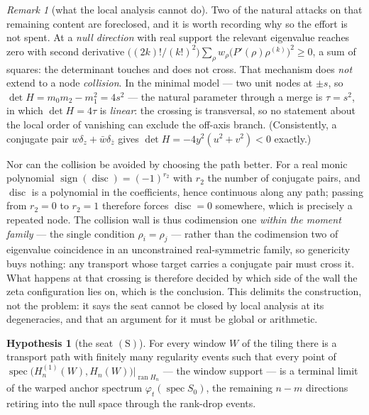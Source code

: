 \documentclass[11pt]{article}
\theoremstyle{plain}
\theoremstyle{definition}
\newtheorem{hypothesis}[theorem]{Hypothesis}
\theoremstyle{remark}
\newtheorem{remark}[theorem]{Remark}
\DeclareMathOperator{\spec}{spec}
\DeclareMathOperator{\ran}{ran}
\begin{document}
\begin{remark}[what the local analysis cannot do]\label{rem:collisionwall}
Two of the natural attacks on that remaining content are foreclosed, and it is
worth recording why so the effort is not spent. At a \emph{null direction} with
real support the relevant eigenvalue reaches zero with second derivative
$\bigl((2k)!/(k!)^2\bigr)\sum_\rho w_\rho\bigl(P'(\rho)\rho^{(k)}\bigr)^2\ge0$, a
sum of squares: the determinant touches and does not cross. That mechanism does
\emph{not} extend to a node \emph{collision}. In the minimal model --- two unit
nodes at $\pm s$, so $\det H=m_0m_2-m_1^2=4s^2$ --- the natural parameter through
a merge is $\tau=s^2$, in which $\det H=4\tau$ is \emph{linear}: the crossing is
transversal, so no statement about the local order of vanishing can exclude the
off-axis branch. (Consistently, a conjugate pair $w\delta_z+\bar w\delta_{\bar z}$
gives $\det H=-4y^2(u^2+v^2)<0$ exactly.)

Nor can the collision be avoided by choosing the path better. For a real monic
polynomial $\operatorname{sign}(\operatorname{disc})=(-1)^{r_2}$ with $r_2$ the
number of conjugate pairs, and $\operatorname{disc}$ is a polynomial in the
coefficients, hence continuous along any path; passing from $r_2=0$ to $r_2=1$
therefore forces $\operatorname{disc}=0$ somewhere, which is precisely a repeated
node. The collision wall is thus codimension one \emph{within the moment family}
--- the single condition $\rho_i=\rho_j$ --- rather than the codimension two of
eigenvalue coincidence in an unconstrained real-symmetric family, so genericity
buys nothing: any transport whose target carries a conjugate pair must cross it.
What happens at that crossing is therefore decided by which side of the wall the
zeta configuration lies on, which is the conclusion. This delimits the
construction, not the problem: it says the seat cannot be closed by local
analysis at its degeneracies, and that an argument for it must be global or
arithmetic.
\end{remark}

\begin{hypothesis}[the seat $(\mathrm{S})$]\label{hyp:seat}
For every window $W$ of the tiling there is a transport path with finitely many
regularity events such that every point of
$\spec\bigl(H^{(1)}_n(W),H_n(W)\bigr)\big|_{\ran H_n}$ --- the window support --- is a
terminal limit of the warped anchor spectrum $\varphi_t(\spec S_0)$, the remaining
$n-m$ directions retiring into the null space through the rank-drop events.
\end{hypothesis}
\end{document}
